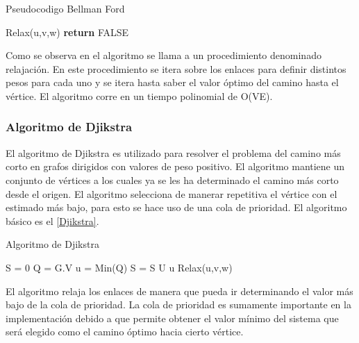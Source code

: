 \documentclass[a4paper, 11pt]{report}
\begin{document}
\begin{algorithm}
\caption{Pseudocodigo Bellman Ford}
\label{Bellman-Ford}
\begin{algorithmic}
            \State Relax(u,v,w)
        \EndFor
    \EndFor
            \State \textbf{return} FALSE
        \EndIf
    \EndFor
\EndProcedure
\end{algorithmic}
\end{algorithm}

Como se observa en el algoritmo se llama a un procedimiento denominado relajaci\'on. En este procedimiento se itera sobre los enlaces para definir distintos pesos para cada uno y se itera hasta saber el valor \'optimo del camino hasta el v\'ertice. El algoritmo corre en un tiempo polinomial de O(VE).

\subsubsection{Algoritmo de Djikstra}
El algoritmo de Djikstra es utilizado para resolver el problema del camino m\'as corto en grafos dirigidos con valores de peso positivo. El algoritmo mantiene un conjunto de v\'ertices a los cuales ya se les ha determinado el camino m\'as corto desde el origen. El algoritmo selecciona de manerar repetitiva el v\'ertice con el estimado m\'as bajo, para esto se hace uso de una cola de prioridad. El algoritmo b\'asico es el \ref{Djikstra}.

\begin{algorithm}
\caption{Algoritmo de Djikstra}
\label{Djikstra}
\begin{algorithmic}
    \State S = 0
    \State Q = G.V
        \State u = Min(Q)
        \State S = S U {u}
            \State Relax(u,v,w)
        \EndFor
    \EndWhile    
\EndProcedure
\end{algorithmic}
\end{algorithm}

El algoritmo relaja los enlaces de manera que pueda ir determinando el valor m\'as bajo de la cola de prioridad. La cola de prioridad es sumamente importante en la implementaci\'on debido a que permite obtener el valor m\'inimo del sistema que ser\'a elegido como el camino \'optimo hacia cierto v\'ertice.
\end{document}
